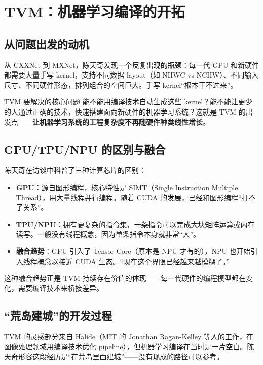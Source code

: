 \section{TVM：机器学习编译的开拓}

\subsection{从问题出发的动机}

从 CXXNet 到 MXNet，陈天奇发现一个反复出现的瓶颈：每一代 GPU 和新硬件都需要大量手写 kernel，支持不同数据 layout（如 NHWC vs NCHW）、不同输入尺寸、不同硬件形态，排列组合的空间巨大。手写 kernel``根本干不过来''。

\begin{importantbox}{TVM 要解决的核心问题}
能不能用编译技术自动生成这些 kernel？能不能让更少的人通过正确的技术，快速搭建面向新硬件的机器学习系统？这就是 TVM 的出发点------\textbf{让机器学习系统的工程复杂度不再随硬件种类线性增长}。
\end{importantbox}

\subsection{GPU/TPU/NPU 的区别与融合}

陈天奇在访谈中科普了三种计算芯片的区别：

\begin{itemize}
    \item \textbf{GPU}：源自图形编程，核心特性是 SIMT（Single Instruction Multiple Thread），用大量线程并行编程。随着 CUDA 的发展，已经和图形编程``打不了关系''。
    \item \textbf{TPU/NPU}：拥有更复杂的指令集，一条指令可以完成大块矩阵运算或内存读写。一般没有线程概念，因为单条指令本身就非常``大''。
    \item \textbf{融合趋势}：GPU 引入了 Tensor Core（原本是 NPU 才有的），NPU 也开始引入线程概念以接近 CUDA 生态。``现在这个界限已经越来越模糊了。''
\end{itemize}

这种融合趋势正是 TVM 持续存在价值的体现------每一代硬件的编程模型都在变化，需要编译技术来桥接差异。

\subsection{``荒岛建城''的开发过程}

TVM 的灵感部分来自 Halide（MIT 的 Jonathan Ragan-Kelley 等人的工作，在图像处理领域用编译技术优化 pipeline），但机器学习编译在当时是一片空白。陈天奇形容这段经历是``在荒岛里面建城''------没有现成的路径可以参考。

